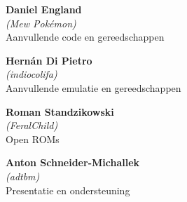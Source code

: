 \begin{mega65thanks}
\begin{minipage}{\linewidth}
    {\large\bf Daniel England} \\
    \textit{(Mew Pokémon)} \\
    Aanvullende code en gereedschappen
\end{minipage}

\begin{minipage}{\linewidth}
    {\large\bf Hernán Di Pietro} \\
    \textit{(indiocolifa)} \\
    Aanvullende emulatie en gereedschappen
\end{minipage}

\begin{minipage}{\linewidth}
    {\large\bf Roman Standzikowski} \\
    \textit{(FeralChild)} \\
    Open ROMs
\end{minipage}

\begin{minipage}{\linewidth}
    {\large\bf Anton Schneider-Michallek} \\
    \textit{(adtbm)} \\
    Presentatie en ondersteuning
\end{minipage}

\end{mega65thanks}
